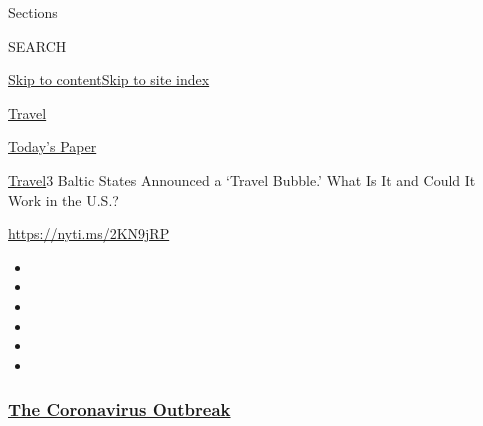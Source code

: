 Sections

SEARCH

\protect\hyperlink{site-content}{Skip to
content}\protect\hyperlink{site-index}{Skip to site index}

\href{https://www.nytimes3xbfgragh.onion/section/travel}{Travel}

\href{https://myaccount.nytimes3xbfgragh.onion/auth/login?response_type=cookie\&client_id=vi}{}

\href{https://www.nytimes3xbfgragh.onion/section/todayspaper}{Today's
Paper}

\href{/section/travel}{Travel}\textbar{}3 Baltic States Announced a
`Travel Bubble.' What Is It and Could It Work in the U.S.?

\url{https://nyti.ms/2KN9jRP}

\begin{itemize}
\item
\item
\item
\item
\item
\item
\end{itemize}

\hypertarget{the-coronavirus-outbreak}{%
\subsubsection{\texorpdfstring{\href{https://www.nytimes3xbfgragh.onion/news-event/coronavirus?name=styln-coronavirus-national\&region=TOP_BANNER\&variant=undefined\&block=storyline_menu_recirc\&action=click\&pgtype=Article\&impression_id=d5b12900-e38e-11ea-bbe8-bf70f691015a}{The
Coronavirus
Outbreak}}{The Coronavirus Outbreak}}\label{the-coronavirus-outbreak}}

